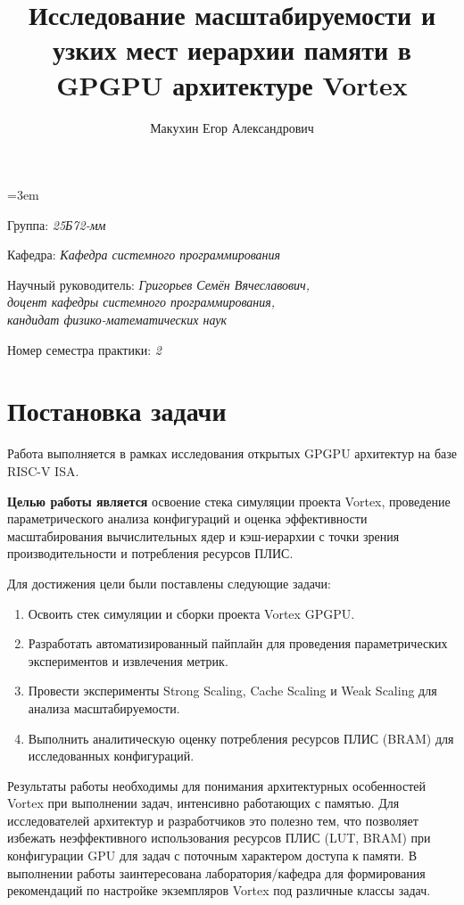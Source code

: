 \documentclass[a4paper]{article}
\title{Исследование масштабируемости и узких мест иерархии памяти в GPGPU архитектуре Vortex}
\author{Макухин Егор Александрович}
\date{}
\begin{document}
\raggedbottom
\sloppy
\emergencystretch=3em

\maketitle

\begin{flushright}
    Группа: \emph{25Б72-мм}

    Кафедра: \emph{Кафедра системного программирования}

    Научный руководитель: \emph{Григорьев Семён Вячеславович,}\\
    \emph{доцент кафедры системного программирования,}\\
    \emph{кандидат физико-математических наук}
    
    Номер семестра практики: \emph{2}
\end{flushright} 


\section{Постановка задачи}

Работа выполняется в рамках исследования открытых GPGPU архитектур на базе RISC-V ISA. 

\textbf{Целью работы является} освоение стека симуляции проекта Vortex, проведение параметрического анализа конфигураций и оценка эффективности масштабирования вычислительных ядер и кэш-иерархии с точки зрения производительности и потребления ресурсов ПЛИС.

Для достижения цели были поставлены следующие задачи:
\begin{enumerate}
    \item Освоить стек симуляции и сборки проекта Vortex GPGPU.
    \item Разработать автоматизированный пайплайн для проведения параметрических экспериментов и извлечения метрик.
    \item Провести эксперименты Strong Scaling, Cache Scaling и Weak Scaling для анализа масштабируемости.
    \item Выполнить аналитическую оценку потребления ресурсов ПЛИС (BRAM) для исследованных конфигураций.
\end{enumerate}

Результаты работы необходимы для понимания архитектурных особенностей Vortex при выполнении задач, интенсивно работающих с памятью. Для исследователей архитектур и разработчиков это полезно тем, что позволяет избежать неэффективного использования ресурсов ПЛИС (LUT, BRAM) при конфигурации GPU для задач с поточным характером доступа к памяти. В выполнении работы заинтересована лаборатория/кафедра для формирования рекомендаций по настройке экземпляров Vortex под различные классы задач.
\end{document}
